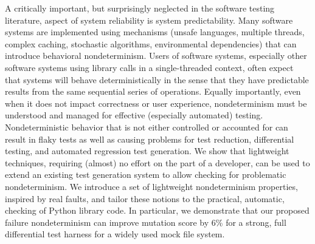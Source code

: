 A critically important, but surprisingly neglected in the software testing literature, aspect of system reliability is system predictability.  Many software systems are implemented using mechanisms (unsafe languages, multiple threads, complex caching, stochastic algorithms, environmental dependencies) that can introduce behavioral nondeterminism.  Users of software systems, especially other software systems using library calls in a single-threaded context, often expect that systems will behave deterministically in the sense that they have predictable results from the same sequential series of operations.  Equally importantly, even when it does not impact correctness or user experience, nondeterminism must be understood and managed for effective (especially automated) testing.  Nondeterministic behavior that is not either controlled or accounted for can result in flaky tests as well as causing problems for test reduction, differential testing, and automated regression test generation.  We show that lightweight techniques, requiring (almost) no effort on the part of a developer, can be used to extend an existing test generation system to allow checking for problematic nondeterminism.  We introduce a set of lightweight nondeterminism properties, inspired by real faults, and tailor these notions to the practical, automatic, checking of Python library code.  In particular, we demonstrate that our proposed failure nondeterminism can improve mutation score by 6\% for a strong, full differential test harness for a widely used mock file system. 